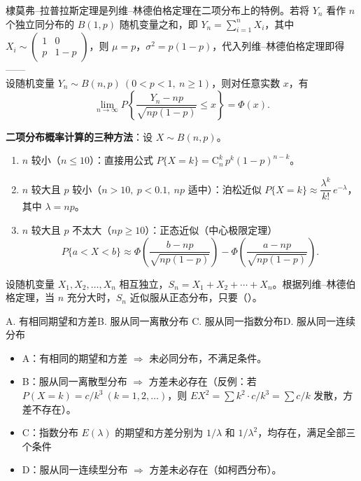 \documentclass[lang=cn,11pt]{elegantbook}
\begin{document}
\begin{theorem} \label{thm:demoivre-laplace}
棣莫弗--拉普拉斯定理是列维--林德伯格定理在二项分布上的特例。若将 \(Y_n\) 看作 \(n\) 个独立同分布的 \(B(1,p)\) 随机变量之和，即 \(Y_n = \sum_{i=1}^{n} X_i\)，其中 \(X_i \sim \begin{pmatrix} 1 & 0 \\ p & 1-p \end{pmatrix}\)，则 \(\mu = p\)，\(\sigma^2 = p(1-p)\)，代入列维--林德伯格定理即得——\\
设随机变量 \(Y_n \sim B(n, p)\ (0 < p < 1,\ n \geq 1)\)，则对任意实数 \(x\)，有
\[
\lim_{n\to\infty} P\!\left\{\frac{Y_n - np}{\sqrt{np(1-p)}} \leq x\right\} = \Phi(x).
\]
\end{theorem}

\textbf{二项分布概率计算的三种方法}：设 \(X \sim B(n, p)\)。
\begin{enumerate}
    \item \(n\) 较小（\(n \leq 10\)）：直接用公式 \(P\{X=k\} = \mathrm{C}_n^k\,p^k(1-p)^{n-k}\)。
    \item \(n\) 较大且 \(p\) 较小（\(n > 10,\ p < 0.1,\ np\) 适中）：泊松近似 \(\displaystyle P\{X=k\} \approx \dfrac{\lambda^k}{k!}\,e^{-\lambda}\)，其中 \(\lambda = np\)。
    \item \(n\) 较大且 \(p\) 不太大（\(np \geq 10\)）：正态近似（中心极限定理）
    \[
    P\{a < X < b\} \approx \Phi\!\left(\frac{b-np}{\sqrt{np(1-p)}}\right) - \Phi\!\left(\frac{a-np}{\sqrt{np(1-p)}}\right).
    \]
\end{enumerate}

\begin{exercise}\label{exer:5-clt-condition}
设随机变量 \(X_1, X_2, \dots, X_n\) 相互独立，\(S_n = X_1 + X_2 + \cdots + X_n\)。根据列维--林德伯格定理，当 \(n\) 充分大时，\(S_n\) 近似服从正态分布，只要（\quad）。\par
A. 有相同期望和方差\quad B. 服从同一离散分布\quad
C. 服从同一指数分布\quad D. 服从同一连续分布
\end{exercise}

\begin{solution}
\begin{itemize}
    \item A：有相同的期望和方差 \(\Rightarrow\) 未必同分布，不满足条件。
    \item B：服从同一离散型分布 \(\Rightarrow\) 方差未必存在（反例：若 \(P(X=k)=c/k^3\ (k=1,2,\dots)\)，则 \(EX^2=\sum k^2\cdot c/k^3=\sum c/k\) 发散，方差不存在）。
    \item C：指数分布 \(E(\lambda)\) 的期望和方差分别为 \(1/\lambda\) 和 \(1/\lambda^2\)，均存在，满足全部三个条件 \checkmark
    \item D：服从同一连续型分布 \(\Rightarrow\) 方差未必存在（如柯西分布）。
\end{itemize}
\end{solution}
\end{document}
